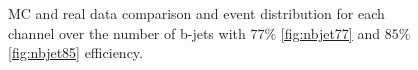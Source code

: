 \begin{figure}
    \caption{\ac{MC} and real data comparison and event distribution for each channel over the number of b-jets 
    with $77\%$ \ref{fig:nbjet77} and $85\%$ \ref{fig:nbjet85} efficiency.}
    \label{fig:DistLast}
\end{figure}